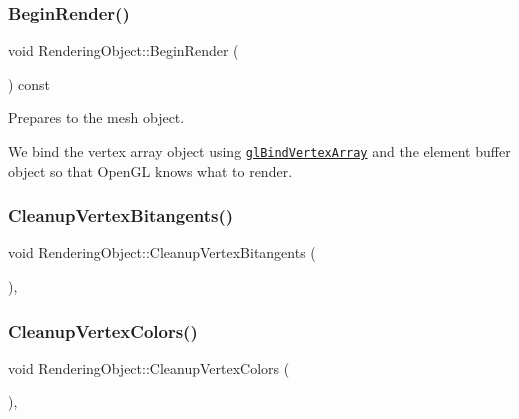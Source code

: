 \subsubsection{\texorpdfstring{Begin\+Render()}{BeginRender()}}
{\footnotesize\ttfamily void Rendering\+Object\+::\+Begin\+Render (\begin{DoxyParamCaption}{ }\end{DoxyParamCaption}) const\hspace{0.3cm}{\ttfamily [virtual]}}



Prepares to the mesh object. 

We bind the vertex array object using \href{https://www.opengl.org/sdk/docs/man/html/glBindVertexArray.xhtml}{\tt gl\+Bind\+Vertex\+Array} and the element buffer object so that Open\+GL knows what to render. \hypertarget{class_rendering_object_ae60c4f13ea817ffcb722d34250664c41}{}\label{class_rendering_object_ae60c4f13ea817ffcb722d34250664c41} 
\subsubsection{\texorpdfstring{Cleanup\+Vertex\+Bitangents()}{CleanupVertexBitangents()}}
{\footnotesize\ttfamily void Rendering\+Object\+::\+Cleanup\+Vertex\+Bitangents (\begin{DoxyParamCaption}{ }\end{DoxyParamCaption})\hspace{0.3cm}{\ttfamily [protected]}, {\ttfamily [virtual]}}

\hypertarget{class_rendering_object_adce4a6d6406eb589b088bedd19127f32}{}\label{class_rendering_object_adce4a6d6406eb589b088bedd19127f32} 
\subsubsection{\texorpdfstring{Cleanup\+Vertex\+Colors()}{CleanupVertexColors()}}
{\footnotesize\ttfamily void Rendering\+Object\+::\+Cleanup\+Vertex\+Colors (\begin{DoxyParamCaption}{ }\end{DoxyParamCaption})\hspace{0.3cm}{\ttfamily [protected]}, {\ttfamily [virtual]}}

